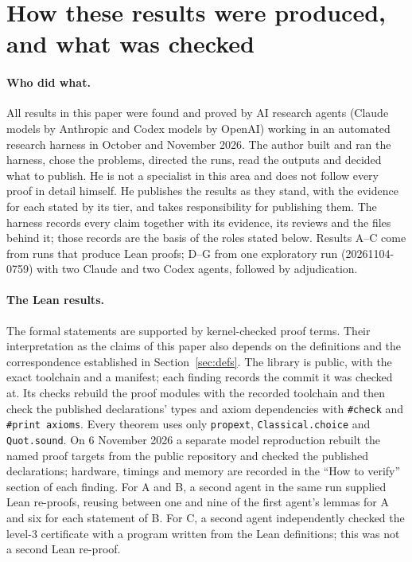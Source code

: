 \section{How these results were produced, and what was checked}\label{sec:process}

\paragraph{Who did what.}  All results in this paper were found and proved by AI research
agents (Claude models by Anthropic and Codex models by OpenAI) working in an automated
research harness in October and November 2026.  The author built and ran the harness, chose
the problems, directed the runs, read the outputs and decided what to publish.  He is not a
specialist in this area and does not follow every proof in detail himself.  He publishes the
results as they stand, with the evidence for each stated by its tier, and takes
responsibility for publishing them.  The harness records every claim together with its
evidence, its reviews and the files behind it; those records are the basis of the roles stated
below.  Results A--C come from runs that produce Lean proofs; D--G from one exploratory run
(20261104-0759) with two Claude and two Codex agents, followed by adjudication.

\paragraph{The Lean results.}  The formal statements are supported by kernel-checked proof
terms.  Their interpretation as the claims of this paper also depends on the definitions and
the correspondence established in Section~\ref{sec:defs}.  The library is public, with the exact toolchain and a
manifest; each finding records the commit it was checked at.  Its checks rebuild the proof modules with
the recorded toolchain and then check the published declarations' types and axiom
dependencies with \texttt{\#check} and \texttt{\#print axioms}.  Every theorem uses
only \texttt{propext}, \texttt{Classical.choice} and \texttt{Quot.sound}.  On 6 November 2026 a separate model reproduction rebuilt the named proof targets from the
public repository and checked the published declarations; hardware, timings and memory are
recorded in the ``How to verify'' section of each finding.
For A and B, a second agent in the same run supplied Lean re-proofs, reusing between one and
nine of the first agent's lemmas for A and six for each statement of B.  For C, a second agent
independently checked the level-3 certificate with a program written from the Lean
definitions; this was not a second Lean re-proof.

